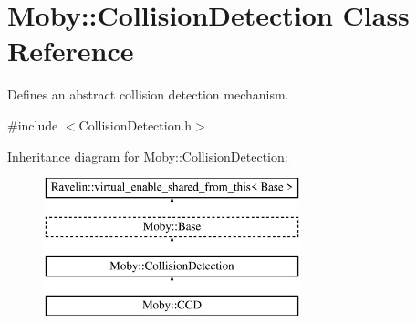 \section{Moby\-:\-:Collision\-Detection Class Reference}
\label{classMoby_1_1CollisionDetection}


Defines an abstract collision detection mechanism.  




{\ttfamily \#include $<$Collision\-Detection.\-h$>$}

Inheritance diagram for Moby\-:\-:Collision\-Detection\-:\begin{figure}[H]
\begin{center}
\leavevmode
\includegraphics[height=4.000000cm]{classMoby_1_1CollisionDetection}
\end{center}
\end{figure}
